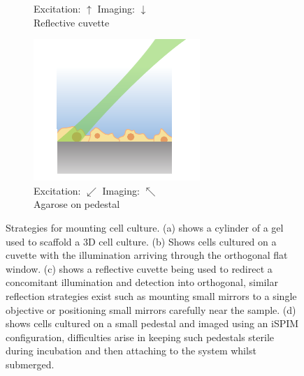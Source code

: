 \begin{figure}
\begin{subfigure}[b]{0.4\linewidth}
         \caption{Excitation: \(\uparrow\) \quad  Imaging: \(\downarrow\) \\ Reflective cuvette}
    \end{subfigure}
    \begin{subfigure}[b]{0.4\linewidth}
             \centering
             \captionsetup{justification=centering}
        \includegraphics{mounting_strategies_cells/pedestal}
         \caption{Excitation: \(\swarrow\) \quad Imaging: \(\nwarrow\) \\ Agarose on pedestal}
    \end{subfigure}
    \caption[Strategies for mounting cell culture]{Strategies for mounting cell culture.
    (a) shows a cylinder of a gel used to scaffold a 3D cell culture.
    (b) Shows cells cultured on a cuvette with the illumination arriving through the orthogonal flat window.
    (c) shows a reflective cuvette being used to redirect a concomitant illumination and detection into orthogonal, similar reflection strategies exist such as mounting small mirrors to a single objective or positioning small mirrors carefully near the sample.
    (d) shows cells cultured on a small pedestal and imaged using an iSPIM configuration, difficulties arise in keeping such pedestals sterile during incubation and then attaching to the system whilst submerged.
    }\label{fig:mounting_strategies_cells}
\end{figure}
%
%
%
